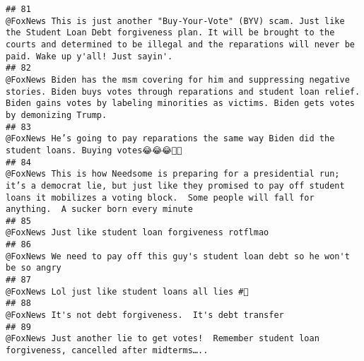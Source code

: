 \documentclass[
]{article}
\begin{document}
\begin{verbatim}
## 81                                                           @FoxNews This is just another "Buy-Your-Vote" (BYV) scam. Just like the Student Loan Debt forgiveness plan. It will be brought to the courts and determined to be illegal and the reparations will never be paid. Wake up y'all! Just sayin'.
## 82                                                                  @FoxNews Biden has the msm covering for him and suppressing negative stories. Biden buys votes through reparations and student loan relief. Biden gains votes by labeling minorities as victims. Biden gets votes by demonizing Trump.
## 83                                                                                                                                                                                                 @FoxNews He’s going to pay reparations the same way Biden did the student loans. Buying votes😂😂😂🙌🏻
## 84                                                              @FoxNews This is how Needsome is preparing for a presidential run; it’s a democrat lie, but just like they promised to pay off student loans it mobilizes a voting block.  Some people will fall for anything.  A sucker born every minute
## 85                                                                                                                                                                                                                                                    @FoxNews Just like student loan forgiveness rotflmao
## 86                                                                                                                                                                                                                        @FoxNews We need to pay off this guy's student loan debt so he won't be so angry
## 87                                                                                                                                                                                                                                                       @FoxNews Lol just like student loans all lies #🤡
## 88                                                                                                                                                                                                                                                 @FoxNews It's not debt forgiveness.  It's debt transfer
## 89                                                                                                                                                                                                 @FoxNews Just another lie to get votes!  Remember student loan forgiveness, cancelled after midterms…..

\end{verbatim}
\end{document}
